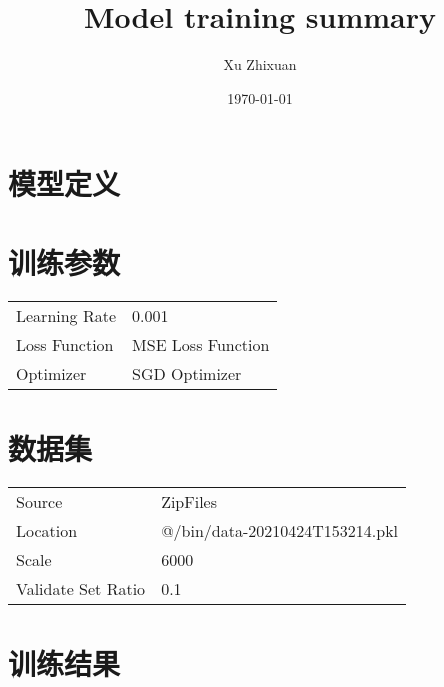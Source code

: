 \documentclass{ctexrep}
\title{Model training summary}
\author{Xu Zhixuan}
\date{\today}
\begin{document}
\section*{\heiti 模型定义}
\section*{\heiti 训练参数}
\begin{table}[h]
    \begin{tabular}{ll}
        Learning Rate & 0.001             \\
        Loss Function & MSE Loss Function \\
        Optimizer     & SGD Optimizer     \\
    \end{tabular}
\end{table}
\section*{\heiti 数据集}
\begin{table}[h]
    \begin{tabular}{ll}
        Source             & ZipFiles                       \\
        Location           & @/bin/data-20210424T153214.pkl \\
        Scale              & 6000                           \\
        Validate Set Ratio & 0.1                            \\
    \end{tabular}
\end{table}
\section*{\heiti 训练结果}
\end{document}
